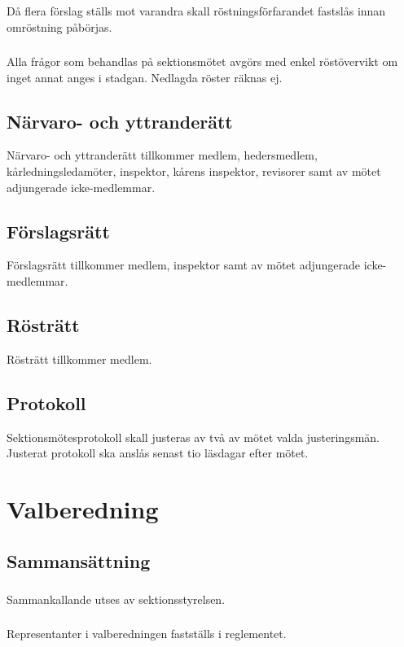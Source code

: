 \documentclass[a4paper]{dtek}
\begin{document}
\subsubsection{}
Då flera förslag ställs mot varandra skall röstningsförfarandet fastslås innan omröstning påbörjas.
\subsubsection{}
Alla frågor som behandlas på sektionsmötet avgörs med enkel röstövervikt om inget annat anges i stadgan. Nedlagda röster räknas ej.
\subsection{Närvaro- och yttranderätt}
Närvaro- och yttranderätt tillkommer medlem, hedersmedlem, kårledningsledamöter, inspektor, kårens inspektor, revisorer samt av mötet adjungerade icke-medlemmar.
\subsection{Förslagsrätt}
Förslagsrätt tillkommer medlem, inspektor samt av mötet adjungerade icke-medlemmar.
\subsection{Rösträtt}
Rösträtt tillkommer medlem.
\subsection{Protokoll}
Sektionsmötesprotokoll skall justeras av två av mötet valda justeringsmän. Justerat protokoll ska anslås senast tio läsdagar efter mötet.
\newpage

\section{Valberedning}
\subsection{Sammansättning}
\subsubsection{}
Sammankallande utses av sektionsstyrelsen.
\subsubsection{}
Representanter i valberedningen fastställs i reglementet.
\end{document}
